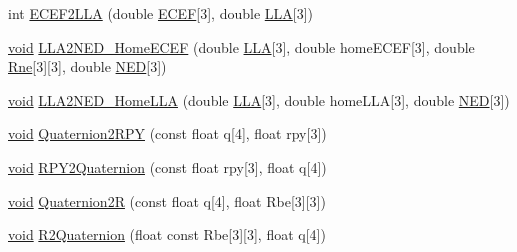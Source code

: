 \begin{DoxyCompactItemize}
\item 
int \hyperlink{class_utils_1_1_coordinate_conversions_a7051104006671c1328016dd2825b365b}{\-E\-C\-E\-F2\-L\-L\-A} (double \hyperlink{_o_p_plots_8m_a749c00b6567f3aec22be08e4a80470f9}{\-E\-C\-E\-F}\mbox{[}3\mbox{]}, double \hyperlink{_o_p_plots_8m_ac4d07718b2724e836be86fbe0c8c5704}{\-L\-L\-A}\mbox{[}3\mbox{]})
\item 
\hyperlink{group___u_a_v_objects_plugin_ga444cf2ff3f0ecbe028adce838d373f5c}{void} \hyperlink{class_utils_1_1_coordinate_conversions_ab6c71c876b0366488f55455d5a450013}{\-L\-L\-A2\-N\-E\-D\-\_\-\-Home\-E\-C\-E\-F} (double \hyperlink{_o_p_plots_8m_ac4d07718b2724e836be86fbe0c8c5704}{\-L\-L\-A}\mbox{[}3\mbox{]}, double home\-E\-C\-E\-F\mbox{[}3\mbox{]}, double \hyperlink{_o_p_plots_8m_a9e7515ae37ebdec7707b65891f31cd6d}{\-Rne}\mbox{[}3\mbox{]}\mbox{[}3\mbox{]}, double \hyperlink{_o_p_plots_8m_abb3119256791e93ec6e33c8eee7035d6}{\-N\-E\-D}\mbox{[}3\mbox{]})
\item 
\hyperlink{group___u_a_v_objects_plugin_ga444cf2ff3f0ecbe028adce838d373f5c}{void} \hyperlink{class_utils_1_1_coordinate_conversions_a1dc099f580d3a37ef39bb155cc7e4e62}{\-L\-L\-A2\-N\-E\-D\-\_\-\-Home\-L\-L\-A} (double \hyperlink{_o_p_plots_8m_ac4d07718b2724e836be86fbe0c8c5704}{\-L\-L\-A}\mbox{[}3\mbox{]}, double home\-L\-L\-A\mbox{[}3\mbox{]}, double \hyperlink{_o_p_plots_8m_abb3119256791e93ec6e33c8eee7035d6}{\-N\-E\-D}\mbox{[}3\mbox{]})
\item 
\hyperlink{group___u_a_v_objects_plugin_ga444cf2ff3f0ecbe028adce838d373f5c}{void} \hyperlink{class_utils_1_1_coordinate_conversions_ab31c5e9a595fae1d5754c36e612767c7}{\-Quaternion2\-R\-P\-Y} (const float q\mbox{[}4\mbox{]}, float rpy\mbox{[}3\mbox{]})
\item 
\hyperlink{group___u_a_v_objects_plugin_ga444cf2ff3f0ecbe028adce838d373f5c}{void} \hyperlink{class_utils_1_1_coordinate_conversions_a8a980e54c71e22ba92754dc67b888741}{\-R\-P\-Y2\-Quaternion} (const float rpy\mbox{[}3\mbox{]}, float q\mbox{[}4\mbox{]})
\item 
\hyperlink{group___u_a_v_objects_plugin_ga444cf2ff3f0ecbe028adce838d373f5c}{void} \hyperlink{class_utils_1_1_coordinate_conversions_ad702a970b22f067de795e9ebac95c58e}{\-Quaternion2\-R} (const float q\mbox{[}4\mbox{]}, float \-Rbe\mbox{[}3\mbox{]}\mbox{[}3\mbox{]})
\item 
\hyperlink{group___u_a_v_objects_plugin_ga444cf2ff3f0ecbe028adce838d373f5c}{void} \hyperlink{class_utils_1_1_coordinate_conversions_a7766a4e896afaf476215cc469f5003ba}{\-R2\-Quaternion} (float const \-Rbe\mbox{[}3\mbox{]}\mbox{[}3\mbox{]}, float q\mbox{[}4\mbox{]})
\end{DoxyCompactItemize}


